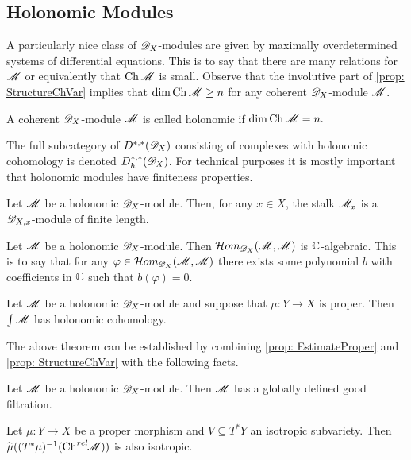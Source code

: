 \subsection{Holonomic Modules}
A particularly nice class of $\mathscr{D}_X$-modules are given by maximally overdetermined systems of differential equations.
This is to say that there are many relations for $\mathscr{M}$ or equivalently that $\operatorname{Ch}\mathscr{M}$ is small.
Observe that the involutive part of \cref{prop: StructureChVar} implies that $\dim \operatorname{Ch}\mathscr{M} \geq n$ for any coherent $\mathscr{D}_X$-module $\mathscr{M}$.
\begin{definition}
  A coherent $\mathscr{D}_X$-module $\mathscr{M}$ is called holonomic if
  $\dim \operatorname{Ch} \mathscr{M}  = n.$
\end{definition}
The full subcategory of $D^{*,*}(\mathscr{D}_X)$ consisting of complexes with holonomic cohomology is denoted $D_h^{*,*}(\mathscr{D}_X)$.
For technical purposes it is mostly important that holonomic modules have finiteness properties.
\begin{proposition}{\cite[Proposition 4.42]{kashiwara2003d}}\label{prop: FiniteLength}
  Let $\mathscr{M}$ be a holonomic $\mathscr{D}_X$-module. Then, for any $x\in X$, the stalk $\mathscr{M}_x$ is a $\mathscr{D}_{X,x}$-module of finite length.
\end{proposition}
\begin{proposition}{\cite[Chapter 5, Proposition 9.2]{bjork1979rings}}\label{prop: HomAlgebraic}
  Let $\mathscr{M}$ be a holonomic $\mathscr{D}_X$-module. Then $\mathcal{H}om_{\mathscr{D}_X}(\mathscr{M},\mathscr{M})$ is $\mathbb{C}$-algebraic. This is to say that for any $\varphi \in\mathcal{H}om_{\mathscr{D}_X}(\mathscr{M},\mathscr{M}) $ there exists some polynomial $b$ with coefficients in $\mathbb{C}$ such that $b(\varphi)=0$.
\end{proposition}
\begin{proposition}{\cite[Corollary 4.10]{kashiwara1976b}}
  Let $\mathscr{M}$ be a holonomic $\mathscr{D}_X$-module and suppose that $\mu:Y\to X$ is proper. Then $\int \mathscr{M}$ has holonomic cohomology.
\end{proposition}
The above theorem can be established by combining \cref{prop: EstimateProper} and \cref{prop: StructureChVar} with the following facts.
\begin{lemma}{\cite[Theorem 4.3.4]{sabbah2011introduction}}
  Let $\mathscr{M}$ be a holonomic $\mathscr{D}_X$-module. Then $\mathscr{M}$ has a globally defined good filtration.
\end{lemma}
\begin{lemma}{\cite[Proposition 4.9.]{kashiwara1976b}}\label{lem: IsotropicDirectImage}
  Let $\mu:Y\to X$ be a proper morphism and $V\subseteq T^*Y$ an isotropic subvariety. Then $\widetilde{\mu}((T^*\mu)^{-1}(\operatorname{Ch}^{rel}\mkern-5mu \mathscr{M}) )$ is also isotropic.
\end{lemma}
